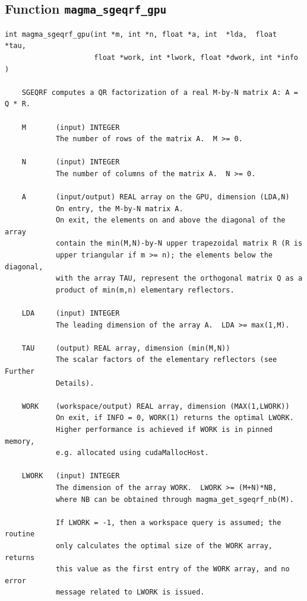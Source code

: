 \documentclass[10pt]{book}
\begin{document}

\newpage
\subsection{Function {\tt {\bf magma\_sgeqrf\_gpu}}}
\begin{verbatim}
int magma_sgeqrf_gpu(int *m, int *n, float *a, int  *lda,  float  *tau,
                     float *work, int *lwork, float *dwork, int *info )
  
    SGEQRF computes a QR factorization of a real M-by-N matrix A: A = Q * R.   

    M       (input) INTEGER   
            The number of rows of the matrix A.  M >= 0.   

    N       (input) INTEGER   
            The number of columns of the matrix A.  N >= 0.   

    A       (input/output) REAL array on the GPU, dimension (LDA,N)   
            On entry, the M-by-N matrix A.   
            On exit, the elements on and above the diagonal of the array   
            contain the min(M,N)-by-N upper trapezoidal matrix R (R is   
            upper triangular if m >= n); the elements below the diagonal,   
            with the array TAU, represent the orthogonal matrix Q as a   
            product of min(m,n) elementary reflectors.

    LDA     (input) INTEGER   
            The leading dimension of the array A.  LDA >= max(1,M).   

    TAU     (output) REAL array, dimension (min(M,N))   
            The scalar factors of the elementary reflectors (see Further   
            Details).   

    WORK    (workspace/output) REAL array, dimension (MAX(1,LWORK))   
            On exit, if INFO = 0, WORK(1) returns the optimal LWORK.   
            Higher performance is achieved if WORK is in pinned memory, 
            e.g. allocated using cudaMallocHost.

    LWORK   (input) INTEGER   
            The dimension of the array WORK.  LWORK >= (M+N)*NB,   
            where NB can be obtained through magma_get_sgeqrf_nb(M).

            If LWORK = -1, then a workspace query is assumed; the routine   
            only calculates the optimal size of the WORK array, returns   
            this value as the first entry of the WORK array, and no error   
            message related to LWORK is issued.   


\end{verbatim}
\end{document}
